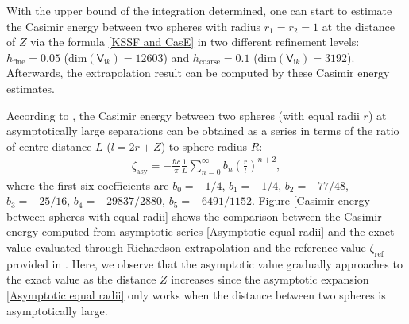 With the upper bound of the integration determined, one can start to estimate the Casimir energy between two spheres with radius $r_1 = r_2 = 1$ at the 
distance of $Z$ via the formula \eqref{KSSF and CasE} in two different refinement levels: $h_{\text{fine}} = 0.05$ 
($\text{dim}(\mathsf{V}_{\mathrm{i}k}) = 12603$) and $h_{\text{coarse}} = 0.1$ ($\text{dim}(\mathsf{V}_{\mathrm{i}k}) = 3192$). Afterwards, the extrapolation result can be computed by these Casimir energy estimates.

According to \cite{emig2008casimir}, the Casimir energy between two spheres (with equal radii $r$) at asymptotically 
large separations can be obtained as a series in terms of the ratio of centre distance $L$ ($l = 2r + Z$) to sphere radius $R$:
\begin{align}\label{Asymptotic equal radii}
   \zeta_{\text{asy}} = -\frac{\hbar c}{\pi}\frac{1}{L}\sum_{n=0}^{\infty}b_{n}\left(\frac{r}{l}\right)^{n+2},
\end{align}
where the first six coefficients are 
$b_{0} = -1/4$, $b_{1} = -1/4$,  $b_{2} = -77/48$,  $b_{3} = -25/16$,  $b_{4} = -29837/2880$, $b_{5} = -6491/1152$. Figure 
\ref{Casimir energy between spheres with equal radii} shows the comparison between the Casimir energy computed from asymptotic series 
\eqref{Asymptotic equal radii} and the exact value evaluated through Richardson extrapolation and the reference value $\zeta_{\text{ref}}$ provided in \cite[Equation (64)]{kenneth2008casimir}. Here, we observe that the asymptotic value gradually 
approaches to the exact value as the distance $Z$ increases since the asymptotic expansion \eqref{Asymptotic equal radii} only works when the distance 
between two spheres is asymptotically large.

